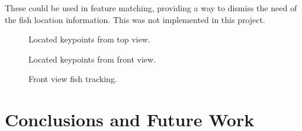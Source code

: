 \documentclass[conference]{IEEEtran}
\begin{document}
These could be used in feature matching, providing a way to dismiss the need of the fish location information. This was not implemented in this project.
\begin{figure}[h]
    \centering
    \caption{Located keypoints from top view.}
    \label{fig:topview}
\end{figure}
\begin{figure}[h]
    \centering
    \caption{Located keypoints from front view.}
    \label{fig:frontview}
\end{figure}

\begin{figure}[h]
    \centering
    \caption{Front view fish tracking.}
    \label{fig:fishloc}
\end{figure}

\section{Conclusions and Future Work}
\end{document}
